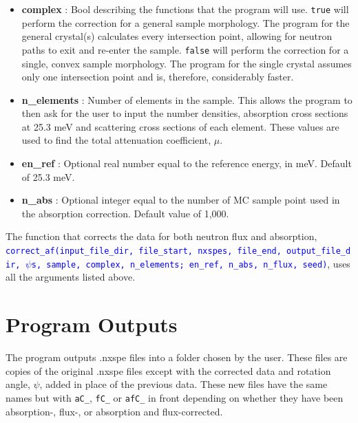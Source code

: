 \documentclass{article}
\begin{document}
\begin{itemize}
    \item \textbf{complex} : Bool describing the functions that the program will use. \verb!true! will perform the correction for a general sample morphology. The program for the general crystal(s) calculates every intersection point, allowing for neutron paths to exit and re-enter the sample. \verb!false! will perform the correction for a single, convex sample morphology. The program for the single crystal assumes only one intersection point and is, therefore, considerably faster.
    \item \textbf{n\_elements} : Number of elements in the sample. This allows the program to then ask for the user to input the number densities, absorption cross sections at 25.3 meV and scattering cross sections of each element. These values are used to find the total attenuation coefficient, $\mu$.
    \item \textbf{en\_ref} : Optional real number equal to the reference energy, in meV. Default of 25.3 meV.
    \item \textbf{n\_abs} : Optional integer equal to the number of MC sample point used in the absorption correction. Default value of 1,000.\\
\end{itemize}
The function that corrects the data for both neutron flux and absorption,
\texttt{\textcolor{blue}{correct\_af(input\_file\_dir,\ file\_start,\ nxspes,\ file\_end,\ output\_file\_dir,\ $\psi$s,\ sample,\ complex,\ n\_elements;\ en\_ref,\ n\_abs,\ n\_flux,\ seed)}}, uses all the arguments listed above.
\section{Program Outputs}
The program outputs .nxspe files into a folder chosen by the user. These files are copies of the original .nxspe files except with the corrected data and rotation angle, $\psi$, added in place of the previous data. These new files have the same names but with \verb!aC_!, \verb!fC_! or \verb!afC_! in front depending on whether they have been absorption-, flux-, or absorption and flux-corrected.
\end{document}
